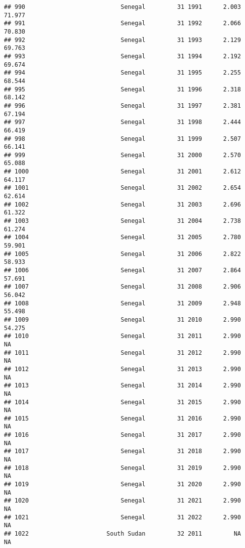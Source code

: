 \documentclass[
]{article}
\begin{document}
\begin{verbatim}
## 990                           Senegal         31 1991      2.003     71.977
## 991                           Senegal         31 1992      2.066     70.830
## 992                           Senegal         31 1993      2.129     69.763
## 993                           Senegal         31 1994      2.192     69.674
## 994                           Senegal         31 1995      2.255     68.544
## 995                           Senegal         31 1996      2.318     68.142
## 996                           Senegal         31 1997      2.381     67.194
## 997                           Senegal         31 1998      2.444     66.419
## 998                           Senegal         31 1999      2.507     66.141
## 999                           Senegal         31 2000      2.570     65.088
## 1000                          Senegal         31 2001      2.612     64.117
## 1001                          Senegal         31 2002      2.654     62.614
## 1002                          Senegal         31 2003      2.696     61.322
## 1003                          Senegal         31 2004      2.738     61.274
## 1004                          Senegal         31 2005      2.780     59.901
## 1005                          Senegal         31 2006      2.822     58.933
## 1006                          Senegal         31 2007      2.864     57.691
## 1007                          Senegal         31 2008      2.906     56.042
## 1008                          Senegal         31 2009      2.948     55.498
## 1009                          Senegal         31 2010      2.990     54.275
## 1010                          Senegal         31 2011      2.990         NA
## 1011                          Senegal         31 2012      2.990         NA
## 1012                          Senegal         31 2013      2.990         NA
## 1013                          Senegal         31 2014      2.990         NA
## 1014                          Senegal         31 2015      2.990         NA
## 1015                          Senegal         31 2016      2.990         NA
## 1016                          Senegal         31 2017      2.990         NA
## 1017                          Senegal         31 2018      2.990         NA
## 1018                          Senegal         31 2019      2.990         NA
## 1019                          Senegal         31 2020      2.990         NA
## 1020                          Senegal         31 2021      2.990         NA
## 1021                          Senegal         31 2022      2.990         NA
## 1022                      South Sudan         32 2011         NA         NA

\end{verbatim}
\end{document}
